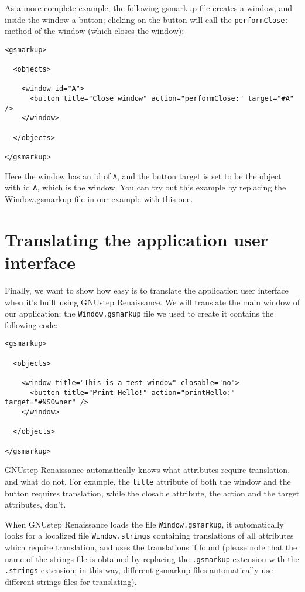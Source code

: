 \documentclass[a4paper]{article}
\begin{document}
As a more complete example, the following gsmarkup file creates a
window, and inside the window a button; clicking on the button will
call the \texttt{performClose:} method of the window (which closes the
window):
\begin{verbatim}
<gsmarkup>

  <objects>

    <window id="A">
      <button title="Close window" action="performClose:" target="#A" />
    </window>

  </objects>

</gsmarkup>
\end{verbatim}
Here the window has an id of \texttt{A}, and the button target is set
to be the object with id \texttt{A}, which is the window.  You can try
out this example by replacing the Window.gsmarkup file in our example
with this one.

\section{Translating the application user interface}
Finally, we want to show how easy is to translate the application user
interface when it's built using GNUstep Renaissance.  We will
translate the main window of our application; the
\texttt{Window.gsmarkup} file we used to create it contains the
following code:
\begin{verbatim}
<gsmarkup>

  <objects>

    <window title="This is a test window" closable="no">
      <button title="Print Hello!" action="printHello:" target="#NSOwner" />
    </window>

  </objects>

</gsmarkup>
\end{verbatim}
GNUstep Renaissance automatically knows what attributes require
translation, and what do not.  For example, the \texttt{title}
attribute of both the window and the button requires translation, while
the closable attribute, the action and the target attributes, don't.

When GNUstep Renaissance loads the file \texttt{Window.gsmarkup}, it
automatically looks for a localized file \texttt{Window.strings}
containing translations of all attributes which require translation,
and uses the translations if found (please note that the name of the
strings file is obtained by replacing the \texttt{.gsmarkup} extension
with the \texttt{.strings} extension; in this way, different gsmarkup
files automatically use different strings files for translating).
\end{document}
